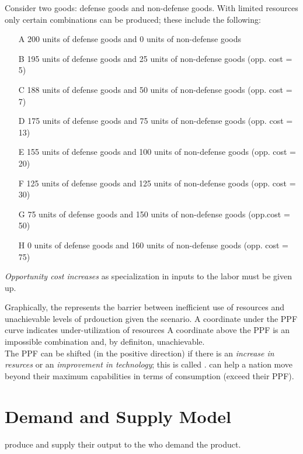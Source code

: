 \documentclass{article}
\begin{document}
\begin{example}
Consider two goods: defense goods and non-defense goods. With limited resources only certain combinations can be produced; these include the following:
  \begin{itemize}
    \item[A] 200 units of defense goods and 0 units of non-defense goods
    \item[B] 195 units of defense goods and 25 units of non-defense goods (opp. cost = 5)
    \item[C] 188 units of defense goods and 50 units of non-defense goods (opp. cost = 7) 
    \item[D] 175 units of defense goods and 75 units of non-defense goods (opp. cost = 13)
    \item[E] 155 units of defense goods and 100 units of non-defense goods (opp. cost = 20)
    \item[F] 125 units of defense goods and 125 units of non-defense goods (opp. cost = 30)
    \item[G] 75 units of defense goods and 150 units of non-defense goods (opp.cost = 50)
    \item[H] 0 units of defense goods and 160 units of non-defense goods (opp. cost = 75)
  \end{itemize}
\emph{Opportunity cost increases} as specialization in inputs to the labor must be given up. 
\end{example}

Graphically, the  represents the barrier between inefficient use of resources and unachievable levels of prdouction given the scenario. A coordinate under the PPF curve indicates under-utilization of resources A coordinate above the PPF is an impossible combination and, by definiton, unachievable. \\

The PPF can be shifted (in the positive direction) if there is an \emph{increase in resurces} or an \emph{improvement in technology}; this is called .  can help a nation move beyond their maximum capabilities in terms of consumption (exceed their PPF). 

\section{Demand and Supply Model}

 produce and supply their output to the  who demand the product. 
\end{document}
